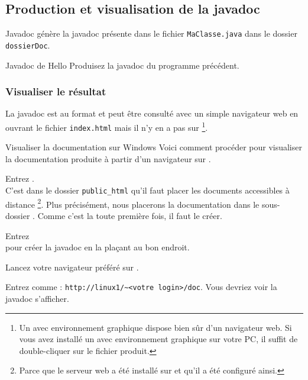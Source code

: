\documentclass[a4paper,11pt]{style-esi/td}
\begin{document}
	\subsection{Production et visualisation de la javadoc}

		\begin{theorie}{Javadoc}
			génère la javadoc présente dans le fichier \texttt{MaClasse.java}
			dans le dossier \texttt{dossierDoc}.
		\end{theorie}

		\begin{Exercice}{Javadoc de Hello}
			Produisez la javadoc du programme  précédent.
		\end{Exercice}

		\subsubsection*{Visualiser le résultat}

		La javadoc est au format  et peut être consulté
		avec un simple navigateur web en ouvrant le fichier \verb|index.html|
		mais il n'y en a pas sur %
		\footnote{%
			Un  avec environnement graphique 
			dispose bien sûr d'un navigateur web.
			Si vous avez installé un  avec environnement graphique
			sur votre PC, il suffit de double-cliquer sur le fichier
			 produit.
		}.
\newpage
		\begin{Tutoriel}{Visualiser la documentation sur Windows}
			Voici comment procéder pour visualiser la documentation
			produite à partir d'un na\-vi\-ga\-teur sur .
			\begin{steps}
			\item 
				Entrez .
				\\
				C'est dans le dossier \verb|public_html|
				qu'il faut placer les documents accessibles à distance%
				\footnote{%
					Parce que le serveur web  a été installé
					sur  et qu'il a été configuré ainsi.
				}.
				Plus précisément, nous placerons la documentation
				dans le sous-dossier .
				Comme c'est la toute première fois, il faut le créer.
			\item 
				Entrez 
				\\pour créer la javadoc en la plaçant au bon endroit.
			\item 
				Lancez votre navigateur préféré sur .
			\item 
				Entrez comme  : \verb|http://linux1/~<votre login>/doc|.
				Vous devriez voir la javadoc s'afficher.
			\end{steps}
		\end{Tutoriel}
\end{document}
